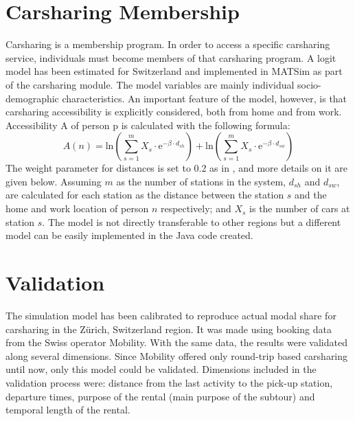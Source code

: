 \section{Carsharing Membership}
Carsharing is a membership program. In order to access a specific carsharing service, individuals must become members of that carsharing program. A logit model has been estimated for Switzerland \citep[][]{CiariWeis_EURO_2014} and implemented in MATSim as part of the carsharing module. The model variables are mainly individual socio-demographic characteristics.  
An important feature of the model, however, is that carsharing accessibility is explicitly considered, both from home and from work. Accessibility A of person p is calculated with the following formula:
%
\begin{equation}
A(n) = \mathrm{ln} \left(\sum_{s=1}^m X_s \cdot \mathrm{e}^{-\beta \cdot d_{sh}}\right) + \mathrm{ln} \left(\sum_{s=1}^{m} X_s \cdot \mathrm{e}^{-\beta \cdot d_{sw}}\right)
\end{equation}
%
The weight parameter for distances is set to 0.2 as in \citet[][]{Weis_PhDThesis_2012}, and more details on it are given below. Assuming $m$ as the number of stations in the system, $d_{sh}$ and $d_{sw}$, are calculated for each station as the distance between the station $s$ and the home and work location of person $n$ respectively; and $X_s$ is the number of cars at station $s$. 
The model is not directly transferable to other regions but a different model can be easily implemented in the Java code created. 

\section{Validation}
The simulation model has been calibrated to reproduce actual modal share for carsharing in the Zürich, Switzerland region. It was made using booking data from the Swiss operator Mobility. With the same data, the results were validated along several dimensions. Since Mobility offered only round-trip based carsharing until now, only this model could be validated. Dimensions included in the validation process were: distance from the last activity to the pick-up station, departure times, purpose of the rental (main purpose of the subtour) and temporal length of the rental. 

